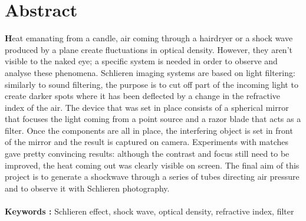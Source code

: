 \section*{Abstract}
\textbf{H}eat emanating from a candle, air coming through a hairdryer or a shock wave produced by a plane create
fluctuations in optical density. However, they aren't visible to the naked eye; a specific system is needed
in order to observe and analyse these phenomena. Schlieren imaging systems are based on light filtering:
similarly to sound filtering, the purpose is to cut off part of the incoming light to create darker spots
where it has been deflected by a change in the refractive index of the air. The device that was set in place
consists of a spherical mirror that focuses the light coming from a point source and a razor blade that acts
as a filter. Once the components are all in place, the interfering object is set in front of the mirror and the
result is captured on camera. Experiments with matches gave pretty convincing results: although the
contrast and focus still need to be improved, the heat coming out was clearly visible on screen. The final
aim of this project is to generate a shockwave through a series of tubes directing air pressure and to
observe it with Schlieren photography.
\\
\\
\small{\textbf{Keywords :} Schlieren effect, shock wave, optical density, refractive index, filter}
